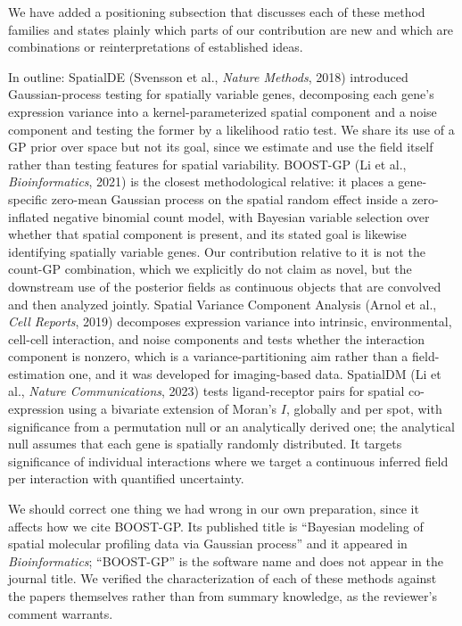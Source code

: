 \documentclass[11pt]{article}
\begin{document}
\noindent We have added a positioning subsection that discusses each of these method
families and states plainly which parts of our contribution are new and which are
combinations or reinterpretations of established ideas.

In outline: SpatialDE (Svensson et al., \emph{Nature Methods}, 2018) introduced
Gaussian-process testing for spatially variable genes, decomposing each gene's expression
variance into a kernel-parameterized spatial component and a noise component and testing the
former by a likelihood ratio test. We share its use of a GP prior over space but not its
goal, since we estimate and use the field itself rather than testing features for spatial
variability. BOOST-GP (Li et al., \emph{Bioinformatics}, 2021) is the closest methodological
relative: it places a gene-specific zero-mean Gaussian process on the spatial random effect
inside a zero-inflated negative binomial count model, with Bayesian variable selection over
whether that spatial component is present, and its stated goal is likewise identifying
spatially variable genes. Our contribution relative to it is not the count-GP combination,
which we explicitly do not claim as novel, but the downstream use of the posterior fields as
continuous objects that are convolved and then analyzed jointly. Spatial Variance Component
Analysis (Arnol et al., \emph{Cell Reports}, 2019) decomposes expression variance into
intrinsic, environmental, cell-cell interaction, and noise components and tests whether the
interaction component is nonzero, which is a variance-partitioning aim rather than a
field-estimation one, and it was developed for imaging-based data. SpatialDM (Li et al.,
\emph{Nature Communications}, 2023) tests ligand-receptor pairs for spatial co-expression
using a bivariate extension of Moran's $I$, globally and per spot, with significance from a
permutation null or an analytically derived one; the analytical null assumes that each gene is
spatially randomly distributed. It targets significance of individual interactions where we
target a continuous inferred field per interaction with quantified uncertainty.

We should correct one thing we had wrong in our own preparation, since it affects how we
cite BOOST-GP. Its published title is ``Bayesian modeling of spatial molecular profiling
data via Gaussian process'' and it appeared in \emph{Bioinformatics}; ``BOOST-GP'' is the
software name and does not appear in the journal title. We verified the characterization of
each of these methods against the papers themselves rather than from summary knowledge, as
the reviewer's comment warrants.
\end{document}
